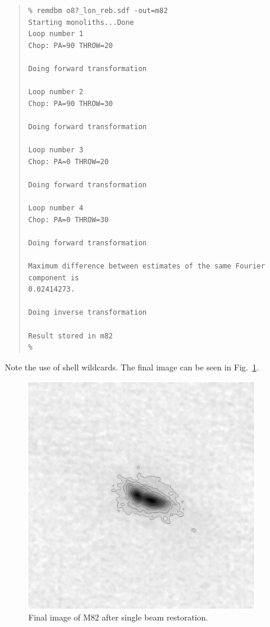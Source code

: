 \documentclass[twoside,11pt]{article}
\newenvironment{myquote}{\begin{quote}\begin{small}}{\end{small}\end{quote}}
\renewcommand{\_}{\texttt{\symbol{95}}}
\begin{document}
\begin{myquote}
\begin{verbatim}
% remdbm o8?_lon_reb.sdf -out=m82
Starting monoliths...Done
Loop number 1
Chop: PA=90 THROW=20
 
Doing forward transformation
 
Loop number 2
Chop: PA=90 THROW=30
 
Doing forward transformation
 
Loop number 3
Chop: PA=0 THROW=20
 
Doing forward transformation
 
Loop number 4
Chop: PA=0 THROW=30
 
Doing forward transformation
 
Maximum difference between estimates of the same Fourier component is
0.02414273.
 
Doing inverse transformation
 
Result stored in m82
%
\end{verbatim}
\end{myquote}
Note the use of shell wildcards. The final image can be seen in
Fig.\ \ref{m82:final}.



\begin{figure}
\begin{center}
\includegraphics[width=4in]{sun216_m82_remdbm.eps}
\caption{Final image of M82 after single beam restoration.}
\label{m82:final}
\end{center}
\end{figure}
\end{document}
